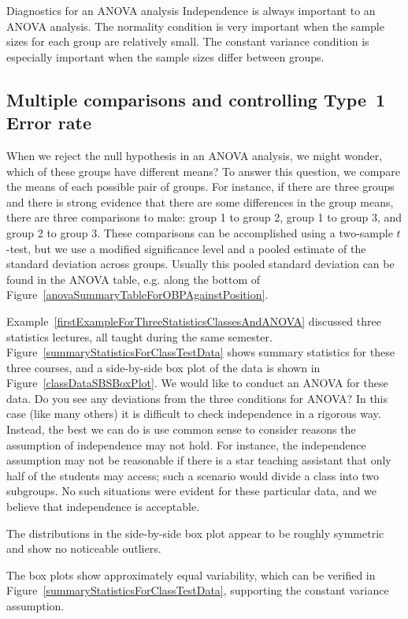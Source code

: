 \begin{onebox}{Diagnostics for an ANOVA analysis}
  Independence is always important to an ANOVA analysis.
  The normality condition is very important when the sample
  sizes for each group are relatively small.
  The constant variance condition is especially important
  when the sample sizes differ between groups.
\end{onebox}


\subsection{Multiple comparisons and controlling Type~1 Error rate}
\label{multipleComparisonsAndControllingTheType1ErrorRate}


When we reject the null hypothesis in an ANOVA analysis, we might wonder, which of these groups have different means? To answer this question, we compare the means of each possible pair of groups. For instance, if there are three groups and there is strong evidence that there are some differences in the group means, there are three comparisons to make: group 1 to group 2, group 1 to group 3, and group 2 to group 3. These comparisons can be accomplished using a two-sample $t$-test, but we use a modified significance level and a pooled estimate of the standard deviation across groups. Usually this pooled standard deviation can be found in the ANOVA table, e.g. along the bottom of Figure~\ref{anovaSummaryTableForOBPAgainstPosition}.

\begin{examplewrap}
\begin{nexample}{Example~\vref{firstExampleForThreeStatisticsClassesAndANOVA} discussed three statistics lectures, all taught during the same semester. Figure~\ref{summaryStatisticsForClassTestData} shows summary statistics for these three courses, and a side-by-side box plot of the data is shown in Figure~\ref{classDataSBSBoxPlot}. We would like to conduct an ANOVA for these data. Do you see any deviations from the three conditions for ANOVA?}
In this case (like many others) it is difficult to check independence in a rigorous way. Instead, the best we can do is use common sense to consider reasons the assumption of independence may not hold. For instance, the independence assumption may not be reasonable if there is a star teaching assistant that only half of the students may access; such a scenario would divide a class into two subgroups. No such situations were evident for these particular data, and we believe that independence is acceptable.

The distributions in the side-by-side box plot appear to be roughly symmetric and show no noticeable outliers.

The box plots show approximately equal variability, which can be verified in Figure~\ref{summaryStatisticsForClassTestData}, supporting the constant variance assumption.
\end{nexample}
\end{examplewrap}

